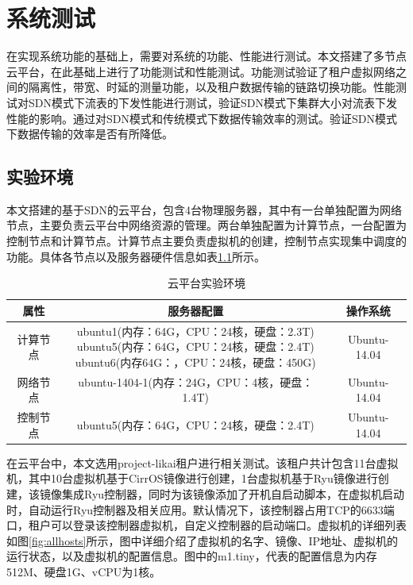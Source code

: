 \chapter{系统测试}
在实现系统功能的基础上，需要对系统的功能、性能进行测试。本文搭建了多节点云平台，在此基础上进行了功能测试和性能测试。功能测试验证了租户虚拟网络之间的隔离性，带宽、时延的测量功能，以及租户数据传输的链路切换功能。性能测试对SDN模式下流表的下发性能进行测试，验证SDN模式下集群大小对流表下发性能的影响。通过对SDN模式和传统模式下数据传输效率的测试。验证SDN模式下数据传输的效率是否有所降低。
\section{实验环境}
本文搭建的基于SDN的云平台，包含4台物理服务器，其中有一台单独配置为网络节点，主要负责云平台中网络资源的管理。两台单独配置为计算节点，一台配置为控制节点和计算节点。计算节点主要负责虚拟机的创建，控制节点实现集中调度的功能。具体各节点以及服务器硬件信息如表\ref{table:environment}所示。

\begin{table}[!htb]
    \centering
	\caption{云平台实验环境}
	\label{table:environment}
	\begin{tabular}{|c|c|c|}
	\hline 
	属性 & 服务器配置 & 操作系统 \\
	\hline
	计算节点& \enter{ubuntu1(内存：64G，CPU：24核，硬盘：2.3T) \\ubuntu5(内存：64G，CPU：24核，硬盘：2.4T)\\ ubuntu6(内存64G：，CPU：24核，硬盘：450G)} & Ubuntu-14.04 \\
	\hline
	网络节点 & ubuntu-1404-1(内存：24G，CPU：4核，硬盘：1.4T) & Ubuntu-14.04 \\
	\hline
	控制节点 & ubuntu5(内存：64G，CPU：24核，硬盘：2.4T) & Ubuntu-14.04 \\
	\hline
	\end{tabular}
\end{table}

在云平台中，本文选用project-likai租户进行相关测试。该租户共计包含11台虚拟机，其中10台虚拟机基于CirrOS镜像进行创建，1台虚拟机基于Ryu镜像进行创建，该镜像集成Ryu控制器，同时为该镜像添加了开机自启动脚本，在虚拟机启动时，自动运行Ryu控制器及相关应用。默认情况下，该控制器占用TCP的6633端口，租户可以登录该控制器虚拟机，自定义控制器的启动端口。虚拟机的详细列表如图\ref{fig:allhosts}所示，图中详细介绍了虚拟机的名字、镜像、IP地址、虚拟机的运行状态，以及虚拟机的配置信息。图中的m1.tiny，代表的配置信息为内存512M、硬盘1G、vCPU为1核。

